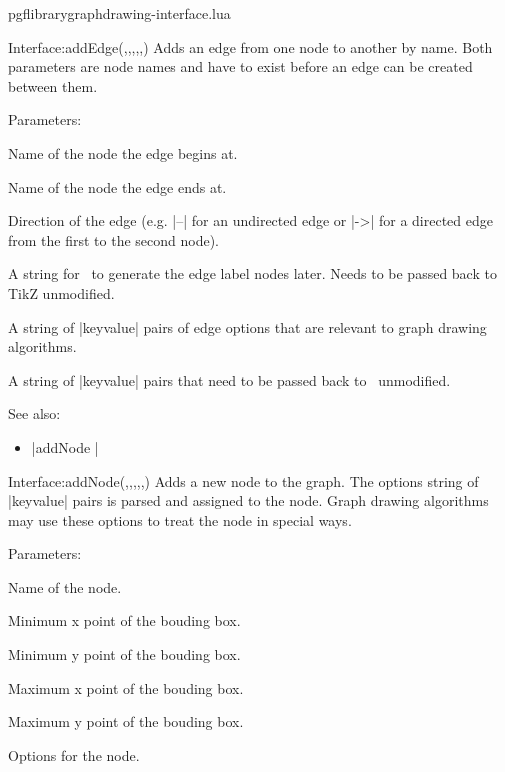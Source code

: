 
\begin{filedescription}{pgflibrarygraphdrawing-interface.lua}


\begin{luacommand}{{Interface:addEdge}(,,,,,)}
Adds an edge from one node to another by name.  Both parameters are node names and have to exist before an edge can be created between them. 

Parameters:
\begin{parameterdescription}
	\item[\meta{from}] Name of the node the edge begins at.\item[\meta{to}] Name of the node the edge ends at.\item[\meta{direction}] Direction of the edge (e.g. |--| for an undirected edge or |->| for a directed edge from the first to the second node).\item[\meta{edgenodes}] A string for \tikzname\ to generate the edge label nodes later. Needs to be passed back to TikZ unmodified.\item[\meta{options}] A string of |{key}{value}| pairs of edge options that are relevant to graph drawing algorithms.\item[\meta{tikzoptions}] A string of |{key}{value}| pairs that need to be passed back to \tikzname\ unmodified. 
\end{parameterdescription}



See also:
\begin{itemize}
	\item[] |addNode |
\end{itemize}

\end{luacommand}\begin{luacommand}{{Interface:addNode}(,,,,,)}
Adds a new node to the graph.  The options string of |{key}{value}| pairs is parsed and assigned to the node. Graph drawing algorithms may use these options to treat the node in special ways. 

Parameters:
\begin{parameterdescription}
	\item[\meta{name}] Name of the node.\item[\meta{xMin}] Minimum x point of the bouding box.\item[\meta{yMin}] Minimum y point of the bouding box.\item[\meta{xMax}] Maximum x point of the bouding box.\item[\meta{yMax}] Maximum y point of the bouding box.\item[\meta{options}] Options for the node. 
\end{parameterdescription}




\end{luacommand}
\end{filedescription}
